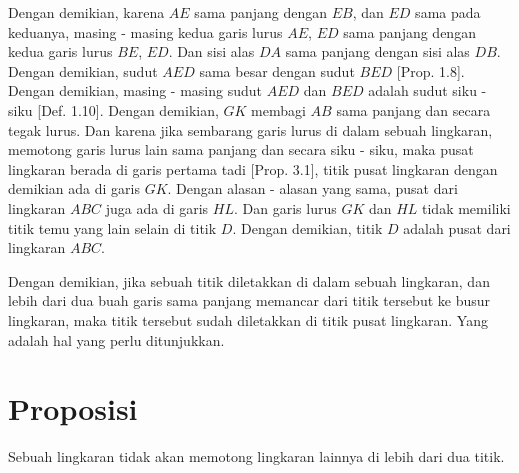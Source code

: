 \documentclass[a4paper]{book}
\begin{document}
Dengan demikian, karena $AE$ sama panjang dengan $EB$, dan $ED$ sama pada keduanya, 
masing - masing kedua garis lurus $AE$, $ED$ sama panjang dengan kedua garis lurus $BE$,
$ED$. Dan sisi alas $DA$ sama panjang dengan sisi alas $DB$. Dengan demikian,
sudut $AED$ sama besar dengan sudut $BED$ [Prop. 1.8]. Dengan demikian, masing - 
masing sudut $AED$ dan $BED$ adalah sudut siku - siku [Def. 1.10]. Dengan 
demikian, $GK$ membagi $AB$ sama panjang dan secara tegak lurus. Dan karena
jika sembarang garis lurus di dalam sebuah lingkaran, memotong garis lurus lain
sama panjang dan secara siku - siku, maka pusat lingkaran berada di garis
pertama tadi [Prop. 3.1], titik pusat lingkaran dengan demikian ada di garis
$GK$.  Dengan alasan - alasan yang sama, pusat dari lingkaran $ABC$ juga ada di
garis $HL$. Dan garis lurus $GK$ dan $HL$ tidak memiliki titik temu yang lain
selain di titik $D$. Dengan demikian, titik $D$ adalah pusat dari lingkaran
$ABC$.

Dengan demikian, jika sebuah titik diletakkan di dalam sebuah lingkaran, dan
lebih dari dua buah garis sama panjang memancar dari titik tersebut ke busur
lingkaran, maka titik tersebut sudah diletakkan di titik pusat lingkaran. Yang
adalah hal yang perlu ditunjukkan.

\section*{\centering Proposisi \thesection}
Sebuah lingkaran tidak akan memotong lingkaran lainnya di lebih dari
dua titik.

\begin{center}
\end{center}
\end{document}
